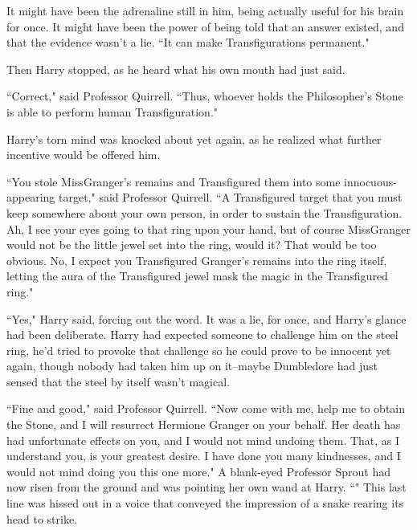 It might have been the adrenaline still in him, being actually useful for his brain for once. It might have been the power of being told that an answer existed, and that the evidence wasn't a lie. ``It can make Transfigurations permanent."

Then Harry stopped, as he heard what his own mouth had just said.

``Correct," said Professor Quirrell. ``Thus, whoever holds the Philosopher's Stone is able to perform human Transfiguration."

Harry's torn mind was knocked about yet again, as he realized what further incentive would be offered him.

``You stole Miss\?Granger's remains and Transfigured them into some innocuous-appearing target," said Professor Quirrell. ``A Transfigured target that you must keep somewhere about your own person, in order to sustain the Transfiguration. Ah, I see your eyes going to that ring upon your hand, but of course Miss\?Granger would not be the little jewel set into the ring, would it? That would be too obvious. No, I expect you Transfigured Granger's remains into the ring itself, letting the aura of the Transfigured jewel mask the magic in the Transfigured ring."

``Yes," Harry said, forcing out the word. It was a lie, for once, and Harry's glance had been deliberate. Harry had expected someone to challenge him on the steel ring, he'd tried to provoke that challenge so he could prove to be innocent yet again, though nobody had taken him up on it\---maybe Dumbledore had just sensed that the steel by itself wasn't magical.

``Fine and good," said Professor Quirrell. ``Now come with me, help me to obtain the Stone, and I will resurrect Hermione Granger on your behalf. Her death has had unfortunate effects on you, and I would not mind undoing them. That, as I understand you, is your greatest desire. I have done you many kindnesses, and I would not mind doing you this one more." A blank-eyed Professor Sprout had now risen from the ground and was pointing her own wand at Harry. ``" This last line was hissed out in a voice that conveyed the impression of a snake rearing its head to strike.

\later

